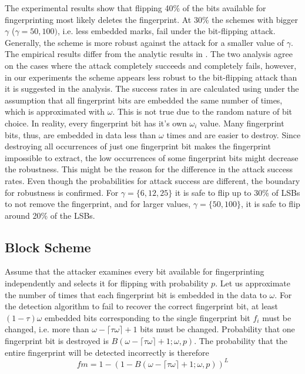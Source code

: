 The experimental results show that flipping 40\% of the bits available for fingerprinting most likely deletes the fingerprint. At 30\% the schemes with bigger $\gamma$ ($\gamma=50,100)$, i.e. less embedded marks, fail under the bit-flipping attack. 
Generally, the scheme is more robust against the attack for a smaller value of $\gamma$.
The empirical results differ from the analytic results in . The two analysis agree on the cases where the attack completely succeeds and completely fails, however, in our experiments the scheme appears less robust to the bit-flipping attack than it is suggested in the analysis. 
The success rates in  are calculated using  under the assumption that all fingerprint bits are embedded the same number of times, which is approximated with $\omega$. 
This is not true due to the random nature of bit choice. In reality, every fingerprint bit has it's own $\omega_i$ value. Many fingerprint bits, thus, are embedded in data less than $\omega$ times and are easier to destroy. Since destroying all occurrences of just one fingerprint bit makes the fingerprint impossible to extract, the low occurrences of some fingerprint bits might decrease the robustness. 
This might be the reason for the difference in the attack success rates. 
Even though the probabilities for attack success are different, the boundary for robustness is confirmed. 
For $\gamma=\{6,12,25\}$ it is safe to flip up to 30\% of LSBs to not remove the fingerprint, and for larger values, $\gamma=\{50,100\}$, it is safe to flip around 20\% of the LSBs.

\subsection{Block Scheme}
Assume that the attacker examines every bit available for fingerprinting independently and selects it for flipping with probability $p$.
Let us approximate the number of times that each fingerprint bit is embedded in the data to $\omega$.
For the detection algorithm to fail to recover the correct fingerprint bit, at least $(1-\tau)\omega$ embedded bits corresponding to the single fingerprint bit $f_i$ must be changed, i.e. more than $\omega - \lceil\tau\omega\rceil+1$ bits must be changed.
Probability that one fingerprint bit is destroyed is $B(\omega-\lceil\tau\omega\rceil+1;\omega,p)$.
The probability that the entire fingerprint will be detected incorrectly is therefore 
\begin{equation}
    fm=1-(1-B(\omega-\lceil\tau\omega\rceil+1;\omega,p))^L
\end{equation}

